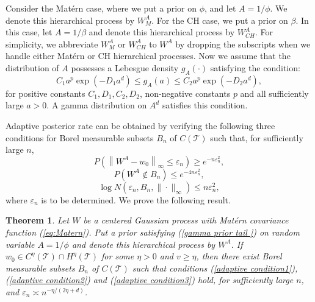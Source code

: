 \documentclass[ejs,noshowframe]{imsart}
\theoremstyle{plain}
\newtheorem{theorem}{Theorem}[section]
\theoremstyle{definition}
\theoremstyle{remark}
\begin{document}
Consider the Mat\'ern  case, where we put a prior on $\phi$, and   let $A=1/\phi$.  We  denote this hierarchical process by $W_M^A$. For the CH case, we put a prior on $\beta$. In this case, let $A=1/\beta$ and denote this  hierarchical process by $W_{CH}^A$. For simplicity, we abbreviate $W_M^A$ or $W^A_{CH}$ to $W^A$ by dropping the subscripts when we handle  either Mat\'ern  or CH  hierarchical processes. Now we assume that the distribution of $A$ possesses a Lebesgue density $g_A(\cdot)$ satisfying the condition: 
\begin{equation} \label{gamma prior tail }
C_1 a^p \exp \left(-D_1 a^{d} \right) \leq g_A(a) \leq C_2 a^p \exp \left(-D_2 a^{d}  \right) ,
\end{equation}
for positive constants $C_1, D_1, C_2, D_2$, non-negative constants $p$ and all  sufficiently large $a>0$. A gamma distribution on $A^{d}$ satisfies this condition.

Adaptive posterior rate can be obtained by verifying the following three conditions \citep{van2009adaptive} for Borel measurable subsets $B_n$ of $C(\mathcal{T})$ such that, for  sufficiently large $n$,
\begin{equation} \label{adaptive condition1}
P\left(\left\|W^A-w_0\right\|_{\infty} \leq \varepsilon_n\right)  \geq e^{-n \varepsilon_n^2},
\end{equation}
\begin{equation}\label{adaptive condition2}
P\left(W^A \notin B_n\right)  \leq e^{-4 n \varepsilon_n^2}, 
\end{equation}
\begin{equation}\label{adaptive condition3}
\log N\left({\varepsilon}_n, B_n,\|\cdot\|_{\infty}\right)  \leq n {\varepsilon}_n^2,
\end{equation}
where $\varepsilon_n$   is to be determined.  We prove the following result.
\begin{theorem}
    \label{adaptive matern}
Let $W$ be a centered  Gaussian process with  Mat\'ern  covariance function (\ref{eq:Matern}).  Put  a prior satisfying (\ref{gamma prior tail }) on random variable  $A=1/\phi$  and denote this hierarchical process by $W^A$. If $w_0 \in C^{\eta}(\mathcal{T} )\cap H^{\eta}(\mathcal{T})$ for some $\eta > 0$ and  $v \ge \eta$, then there exist Borel measurable subsets $B_n$ of  $C(\mathcal{T})$ such that conditions (\ref{adaptive condition1}), (\ref{adaptive condition2}) and (\ref{adaptive condition3}) hold, for  sufficiently large $n$, and $\varepsilon_n \asymp n^{-\eta /(2 \eta+d)}$.
\end{theorem}
\end{document}
